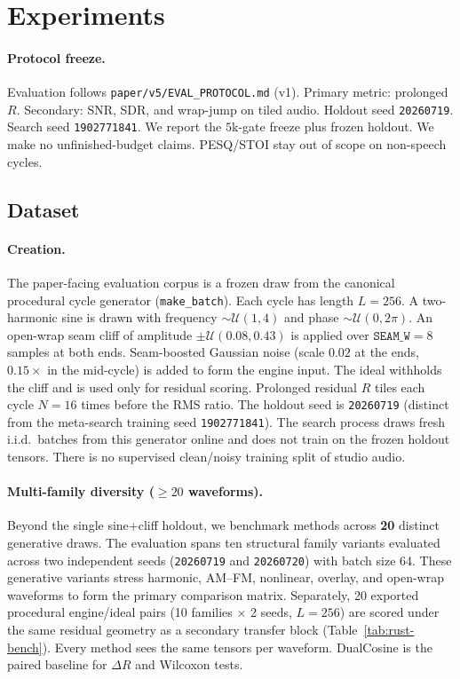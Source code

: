 \section{Experiments}
\label{sec:experiments}

\paragraph{Protocol freeze.}
Evaluation follows \texttt{paper/v5/EVAL\_PROTOCOL.md} (v1).
Primary metric: prolonged $R$. Secondary: SNR, SDR, and wrap-jump on tiled audio.
Holdout seed \texttt{20260719}. Search seed \texttt{1902771841}.
We report the $5$k-gate freeze plus frozen holdout. We make no unfinished-budget claims. PESQ/STOI stay out of scope on non-speech cycles.

\subsection{Dataset}
\label{sec:dataset}

\paragraph{Creation.}
The paper-facing evaluation corpus is a frozen draw from the canonical procedural cycle generator (\texttt{make\_batch}).
Each cycle has length $L{=}256$.
A two-harmonic sine is drawn with frequency $\sim\mathcal{U}(1,4)$ and phase $\sim\mathcal{U}(0,2\pi)$.
An open-wrap seam cliff of amplitude $\pm\mathcal{U}(0.08,0.43)$ is applied over $\texttt{SEAM\_W}{=}8$ samples at both ends.
Seam-boosted Gaussian noise (scale $0.02$ at the ends, $0.15\times$ in the mid-cycle) is added to form the engine input.
The ideal withholds the cliff and is used only for residual scoring.
Prolonged residual $R$ tiles each cycle $N{=}16$ times before the RMS ratio.
The holdout seed is \texttt{20260719} (distinct from the meta-search training seed \texttt{1902771841}).
The search process draws fresh i.i.d.\ batches from this generator online and does not train on the frozen holdout tensors.
There is no supervised clean/noisy training split of studio audio.

\paragraph{Multi-family diversity ($\ge 20$ waveforms).}
Beyond the single sine{+}cliff holdout, we benchmark methods across \textbf{20} distinct generative draws.
The evaluation spans ten structural family variants evaluated across two independent seeds (\texttt{20260719} and \texttt{20260720}) with batch size 64.
These generative variants stress harmonic, AM--FM, nonlinear, overlay, and open-wrap waveforms to form the primary comparison matrix.
Separately, 20 exported procedural engine/ideal pairs (10 families $\times$ 2 seeds, $L{=}256$) are scored under the same residual geometry as a secondary transfer block (Table~\ref{tab:rust-bench}).
Every method sees the same tensors per waveform. DualCosine is the paired baseline for $\Delta R$ and Wilcoxon tests.

